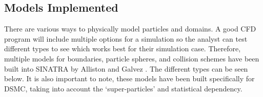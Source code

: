 \subsection{Models Implemented}
\label{sec:models}

There are various ways to physically model particles and domains. A good CFD program will include multiple options for a simulation so the analyst can test different types to see which works best for their simulation case. Therefore, multiple models for boundaries, particle spheres, and collision schemes have been built into SINATRA by Alliston and Galvez \cite{Galvez2018a,mac_thesis}. The different types can be seen below. It is also important to note, these models have been built specifically for DSMC, taking into account the `super-particles' and statistical dependency. 


